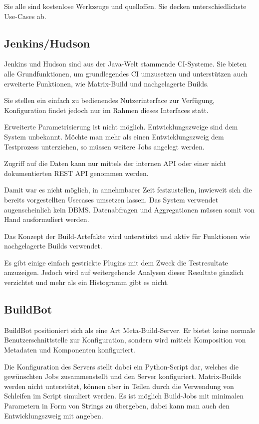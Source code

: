Sie alle sind kostenlose Werkzeuge und quelloffen.
Sie decken unterschiedlichste Use-Cases ab.

\subsection{Jenkins/Hudson}

Jenkins und Hudson sind aus der Java-Welt  stammende \ac{CI}-Systeme.
Sie bieten alle Grundfunktionen, um grundlegendes \ac{CI} umzusetzen
und unterst\"utzen auch erweiterte Funktionen,
wie Matrix-Build und nachgelagerte Builds.

Sie stellen ein einfach zu bedienendes Nutzerinterface zur Verfügung,
Konfiguration findet jedoch nur im Rahmen dieses Interfaces statt.

Erweiterte Parametrisierung ist nicht m\"oglich.
Entwicklungszweige sind dem System unbekannt.
M\"ochte man mehr als einen Entwicklungszweig dem Testprozess unterziehen,
so m\"ussen weitere Jobs angelegt werden.

Zugriff auf die Daten kann nur mittels der internen \ac{API} oder
einer nicht dokumentierten \ac{REST} \ac{API} genommen werden.

Damit war es nicht m\"oglich, in annehmbarer Zeit festzustellen,
inwieweit sich die bereits vorgestellten Usecases umsetzen lassen.
Das System verwendet augenscheinlich kein \ac{DBMS}.
Datenabfragen und Aggregationen m\"ussen
somit von Hand ausformuliert werden.

Das Konzept der Build-Artefakte wird unterst\"utzt und
aktiv f\"ur Funktionen wie nachgelagerte Builds verwendet.

Es gibt einige einfach gestrickte Plugins mit dem Zweck die Testresultate anzuzeigen.
Jedoch wird auf weitergehende Analysen dieser Resultate g\"anzlich verzichtet
und mehr als ein Histogramm gibt es nicht.


\subsection{BuildBot}


BuildBot \cite{buildbot:website} positioniert sich als eine Art Meta-Build-Server.
Er bietet keine normale Benutzerschnittstelle zur Konfiguration,
sondern wird mittels Komposition von Metadaten und Komponenten konfiguriert.

Die Konfiguration des Servers stellt dabei ein Python-Script dar,
welches die gewünschten Jobs zusammenstellt und den Server konfiguriert.
Matrix-Builds werden nicht unterst\"utzt,
k\"onnen aber in Teilen durch die Verwendung von Schleifen im Script simuliert werden.
Es ist möglich Build-Jobs mit minimalen Parametern in Form von Strings zu \"ubergeben,
dabei kann man auch den Entwicklungszweig mit angeben.

